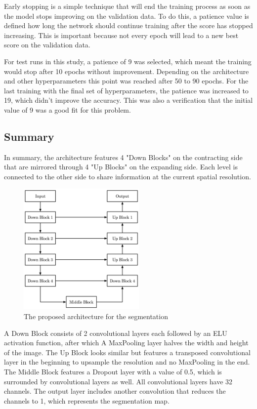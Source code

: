 Early stopping is a simple technique that will end the training process as soon as the model stops improving on the validation data. To do this, a patience value is defined how long the network should continue training after the score has stopped increasing. This is important because not every epoch will lead to a new best score on the validation data.

For test runs in this study, a patience of 9 was selected, which meant the training would stop after 10 epochs without improvement. Depending on the architecture and other hyperparameters this point was reached after 50 to 90 epochs. For the last training with the final set of hyperparameters, the patience was increased to 19, which didn't improve the accuracy.  This was also a verification that the initial value of 9 was a good fit for this problem.

\subsection{Summary}

In summary, the architecture features 4 "Down Blocks" on the contracting side that are mirrored through 4 "Up Blocks" on the expanding side. Each level is connected to the other side to share information at the current spatial resolution.

\begin{figure}[H]
\centering
\par
\includegraphics[width=0.55\textwidth]{imgs/model.png}
\caption{The proposed architecture for the segmentation}
\par
\end{figure}

A Down Block consists of 2 convolutional layers each followed by an ELU activation function, after which A MaxPooling layer halves the width and height of the image. The Up Block looks similar but features a transposed convolutional layer in the beginning to upsample the resolution and no MaxPooling in the end. The Middle Block features a Dropout layer with a value of 0.5, which is surrounded by convolutional layers as well. All convolutional layers have 32 channels. The output layer includes another convolution that reduces the channels to 1, which represents the segmentation map.

